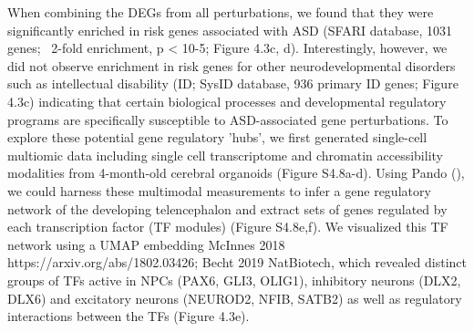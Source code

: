When combining the DEGs from all perturbations, we found that they were significantly enriched in risk genes associated with ASD (SFARI database, 1031 genes; ~2-fold enrichment, p < 10-5; Figure 4.3c, d). Interestingly, however, we did not observe enrichment in risk genes for other neurodevelopmental disorders such as intellectual disability (ID; SysID database, 936 primary ID genes; Figure 4.3c) indicating that certain biological processes and developmental regulatory programs are specifically susceptible to ASD-associated gene perturbations. To explore these potential gene regulatory 'hubs', we first generated single-cell multiomic data including single cell transcriptome and chromatin accessibility modalities from 4-month-old cerebral organoids (Figure S4.8a-d). Using Pando (\cite{fleck_inferring_2021}), we could harness these multimodal measurements to infer a gene regulatory network of the developing telencephalon and extract sets of genes regulated by each transcription factor (TF modules) (Figure S4.8e,f). We visualized this TF network using a UMAP embedding {McInnes 2018 https://arxiv.org/abs/1802.03426; Becht 2019 NatBiotech}, which revealed distinct groups of TFs active in NPCs (PAX6, GLI3, OLIG1), inhibitory neurons (DLX2, DLX6) and excitatory neurons (NEUROD2, NFIB, SATB2) as well as regulatory interactions between the TFs (Figure 4.3e). 

